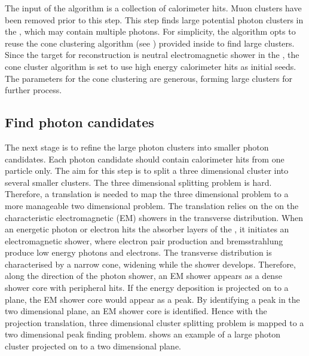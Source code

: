 The input of the \PhotonReconstruction algorithm is a collection of calorimeter hits. Muon clusters have been removed prior to this step.  This step finds large potential photon clusters in the \ECAL, which may contain multiple photons. For simplicity, the algorithm opts to reuse  the cone clustering algorithm (see ) provided inside \pandora to find large clusters. Since the target for reconstruction is neutral electromagnetic shower in the \ECAL, the cone cluster algorithm is set to use high energy calorimeter hits as initial seeds.  The parameters for the cone clustering are generous, forming large clusters for further process.

\subsection{Find photon candidates}
\label{sec:photonCandiate}

The next stage is to refine the large photon clusters into smaller photon candidates. Each photon candidate should contain calorimeter hits from one particle only. The aim for  this step is to split a three dimensional cluster into several smaller clusters. The three dimensional splitting problem is hard. Therefore, a translation is needed to map the three dimensional problem to a more manageable two dimensional problem. The translation relies on the on the characteristic electromagnetic (EM) showers in the transverse distribution. When an energetic photon or electron hits the absorber layers of the \ECAL, it initiates an electromagnetic shower, where electron pair production and bremsstrahlung produce low energy photons and electrons. The transverse distribution is characterised by a narrow cone, widening while the shower develops. Therefore, along the direction of the photon shower, an  EM shower appears as a dense shower core with peripheral hits. If the energy deposition is projected on to a plane, the EM shower core would appear as a peak. By identifying a peak in the two dimensional plane, an EM shower core is identified.  Hence with the projection translation, three dimensional cluster splitting problem is mapped to a two dimensional peak finding problem.  shows an example of a large photon cluster projected on to a two dimensional plane.



